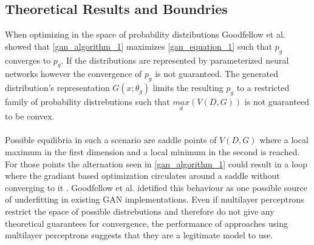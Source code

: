   \subsection{Theoretical Results and Boundries}

  When optimizing in the space of probability distributions Goodfellow et al. \cite{1} showed that \cref{gan_algorithm_1} maximizes \cref{gan_equation_1} such that \( p_g \) converges to \( p_g \).
  If the distributions are represented by parameterized neural networks however the convergence of \( p_g \) is not guaranteed.
  The generated distribution's representation \( G(x; \theta _g) \) limits the resulting \( p_g \) to a restricted family of probability distrebutions such that \( \underset{d}{max}( V(D,G) ) \) is not guaranteed to be convex.
  \\
  \\
  Possible equilibria in such a scenario are saddle points of \( V(D,G) \) where a local maximum in the first dimension and a local minimum in the second is reached.
  For those points the alternation seen in \cref{gan_algorithm_1} could result in a loop where the gradiant based optimization circulates around a saddle without converging to it \cite{2}.
  Goodfellow et al. \cite{3} idetified this behaviour as one possible source of underfitting in existing GAN implementations.
  Even if multilayer perceptrons restrict the space of possible distrebutions and therefore do not give any theoretical guarantees for convergence, the performance of approaches using multilayer perceptrons suggests that they are a legitimate model to use. \cite{1}
